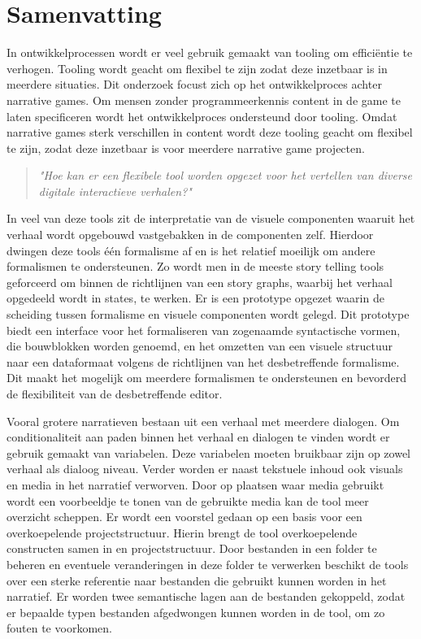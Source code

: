 \chapter*{Samenvatting}
In ontwikkelprocessen wordt er veel gebruik gemaakt van tooling om efficiëntie te verhogen. Tooling wordt geacht om flexibel te zijn zodat deze inzetbaar is in meerdere situaties. Dit onderzoek focust zich op het ontwikkelproces achter narrative games. Om mensen zonder programmeerkennis content in de game te laten specificeren wordt het ontwikkelproces ondersteund door tooling. Omdat narrative games sterk verschillen in content wordt deze tooling geacht om flexibel te zijn, zodat deze inzetbaar is voor meerdere narrative game projecten.
\begin{quote} 
    \centering
    \large
    \textit{
        "Hoe kan er een flexibele tool worden opgezet voor het vertellen van diverse digitale interactieve verhalen?"
    }
\end{quote}

In veel van deze tools zit de interpretatie van de visuele componenten waaruit het verhaal wordt opgebouwd vastgebakken in de componenten zelf. Hierdoor dwingen deze tools één formalisme af en is het relatief moeilijk om andere formalismen te ondersteunen. Zo wordt men in de meeste story telling tools geforceerd om binnen de richtlijnen van een story graphs, waarbij het verhaal opgedeeld wordt in states, te werken. Er is een prototype opgezet waarin de scheiding tussen formalisme en visuele componenten wordt gelegd. Dit prototype biedt een interface voor het formaliseren van zogenaamde syntactische vormen, die bouwblokken worden genoemd, en het omzetten van een visuele structuur naar een dataformaat volgens de richtlijnen van het desbetreffende formalisme. Dit maakt het mogelijk om meerdere formalismen te ondersteunen en bevorderd de flexibiliteit van de desbetreffende editor.

Vooral grotere narratieven bestaan uit een verhaal met meerdere dialogen. Om conditionaliteit aan paden binnen het verhaal en dialogen te vinden wordt er gebruik gemaakt van variabelen. Deze variabelen moeten bruikbaar zijn op zowel verhaal als dialoog niveau. Verder worden er naast tekstuele inhoud ook visuals en media in het narratief verworven. Door op plaatsen waar media gebruikt wordt een voorbeeldje te tonen van de gebruikte media kan de tool meer overzicht scheppen. Er wordt een voorstel gedaan op een basis voor een overkoepelende projectstructuur. Hierin brengt de tool overkoepelende constructen samen in en projectstructuur. Door bestanden in een folder te beheren en eventuele veranderingen in deze folder te verwerken beschikt de tools over een sterke referentie naar bestanden die gebruikt kunnen worden in het narratief. Er worden twee semantische lagen aan de bestanden gekoppeld, zodat er bepaalde typen bestanden afgedwongen kunnen worden in de tool, om zo fouten te voorkomen.


